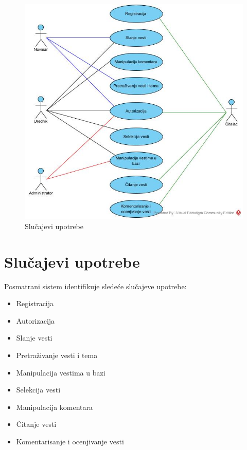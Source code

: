 \documentclass{article}
\begin{document}
\begin{figure}[htbp!]
\centering
\includegraphics[scale=0.7]{Slucajevi_upotrebe.jpg}
\caption{Slučajevi upotrebe}
\label{slk:dtp}
\end{figure}

\newpage

\section{Slučajevi upotrebe}
\indent Posmatrani sistem identifikuje sledeće slučajeve upotrebe:
\begin{itemize} 
\item Registracija
\item Autorizacija 
\item Slanje vesti
\item Pretraživanje vesti i tema
\item Manipulacija vestima u bazi
\item Selekcija vesti 
\item Manipulacija komentara
\item Čitanje vesti
\item Komentarisanje i ocenjivanje vesti

\end{itemize}
\end{document}
